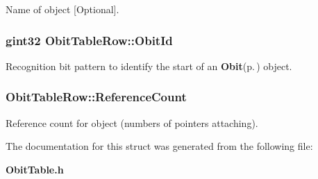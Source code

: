 Name of object [Optional]. 

\subsubsection{\setlength{\rightskip}{0pt plus 5cm}gint32 {\bf Obit\-Table\-Row::Obit\-Id}}\label{structObitTableRow_o0}


Recognition bit pattern to identify the start of an {\bf Obit}{\rm (p.\,\pageref{structObit})} object. 

\subsubsection{ {\bf Obit\-Table\-Row::Reference\-Count}}\label{structObitTableRow_o2}


Reference count for object (numbers of pointers attaching). 



The documentation for this struct was generated from the following file:\begin{CompactItemize}
\item 
{\bf Obit\-Table.h}\end{CompactItemize}
